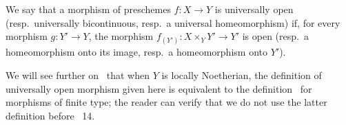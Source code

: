 \begin{definition}[2.4.2]
\label{IV.2.4.2}
We say that a morphism of preschemes $f:X\to Y$ is universally open \textup{(resp.}\ universally bicontinuous, \textup{resp.}\ a universal homeomorphism\textnormal{)} if, for every morphism $g:Y'\to Y$, the morphism $f_{(Y')}:X\times_Y Y'\to Y'$ is open \textup{(resp.}\ a homeomorphism onto its image, \textup{resp.}\ a homeomorphism onto $Y'$\textnormal{)}.
\end{definition}

We will see further on~ that when $Y$ is locally Noetherian, the definition of universally open morphism given here is equivalent to the definition~ for morphisms of finite type; the reader can verify that we do not use the latter definition before \textsection~14.

